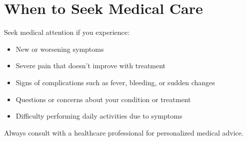 \section*{When to Seek Medical Care}
Seek medical attention if you experience:
\begin{itemize}
\item New or worsening symptoms
\item Severe pain that doesn't improve with treatment
\item Signs of complications such as fever, bleeding, or sudden changes
\item Questions or concerns about your condition or treatment
\item Difficulty performing daily activities due to symptoms
\end{itemize}

Always consult with a healthcare professional for personalized medical advice.